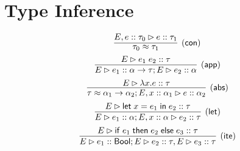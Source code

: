 \newcommand{\proves}{\vdash}
\newcommand{\equal}{=}

\section{Type Inference}
\[
  \infer[(\mathsf{con})]{\tau_0 \approx \tau_1}{E, e :: \tau_0 \rhd e :: \tau_1}
\]
\[
  \infer[(\mathsf{app})]{E \rhd e_1 :: \alpha \rightarrow \tau; E \rhd e_2 :: \alpha}{E \rhd e_1\; e_2 :: \tau}
\]
\[
  \infer[(\mathsf{abs})]{\tau \approx \alpha_1 \rightarrow \alpha_2; E, x :: \alpha_1 \rhd e :: \alpha_2}{E \rhd \lambda x. e :: \tau}
\]
\[
  \infer[(\mathsf{let})]{E \rhd e_1 :: \alpha; E, x :: \alpha \rhd e_2 :: \tau}{E \rhd \mathsf{let}\; x = e_1\; \mathsf{in}\; e_2 :: \tau}
\]
\[
  \infer[(\mathsf{ite})]{E \rhd e_1 :: \mathsf{Bool}; E \rhd e_2 :: \tau, E \rhd e_3 :: \tau}{E \rhd \mathsf{if}\; e_1\; \mathsf{then}\; e_2\; \mathsf{else}\; e_3 :: \tau}
\]

